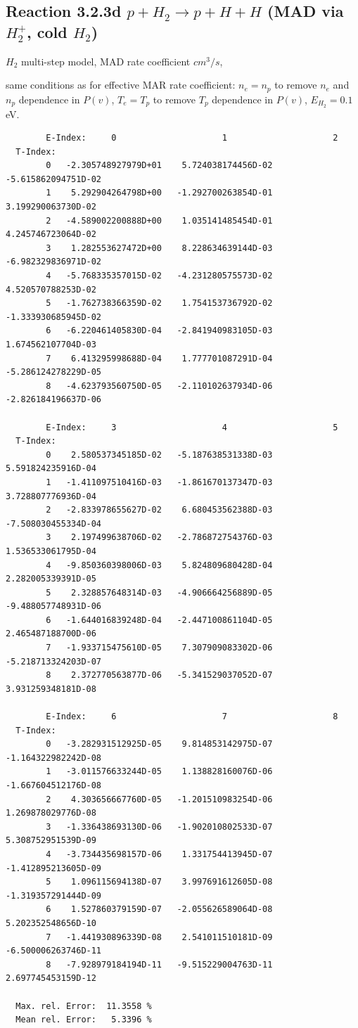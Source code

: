 \documentclass[12pt,dvips]{article}
\begin{document}
\subsection{
Reaction 3.2.3d   $p + H_2   \rightarrow p + H + H  $ (MAD via $H_2^+$, cold $H_2$)
}

$H_2$ multi-step model, MAD rate coefficient $cm^3/s$,

same conditions as for effective MAR rate coefficient: $n_e=n_p$ to remove $n_e$ and $n_p$ dependence in $P(v)$,
$T_e=T_p$ to remove $T_p$ dependence in $P(v)$,  $E_{H_2}=0.1$ eV.

\begin{small}\begin{verbatim}
        E-Index:     0                     1                     2
  T-Index:
        0   -2.305748927979D+01    5.724038174456D-02   -5.615862094751D-02
        1    5.292904264798D+00   -1.292700263854D-01    3.199290063730D-02
        2   -4.589002200888D+00    1.035141485454D-01    4.245746723064D-02
        3    1.282553627472D+00    8.228634639144D-03   -6.982329836971D-02
        4   -5.768335357015D-02   -4.231280575573D-02    4.520570788253D-02
        5   -1.762738366359D-02    1.754153736792D-02   -1.333930685945D-02
        6   -6.220461405830D-04   -2.841940983105D-03    1.674562107704D-03
        7    6.413295998688D-04    1.777701087291D-04   -5.286124278229D-05
        8   -4.623793560750D-05   -2.110102637934D-06   -2.826184196637D-06

        E-Index:     3                     4                     5
  T-Index:
        0    2.580537345185D-02   -5.187638531338D-03    5.591824235916D-04
        1   -1.411097510416D-03   -1.861670137347D-03    3.728807776936D-04
        2   -2.833978655627D-02    6.680453562388D-03   -7.508030455334D-04
        3    2.197499638706D-02   -2.786872754376D-03    1.536533061795D-04
        4   -9.850360398006D-03    5.824809680428D-04    2.282005339391D-05
        5    2.328857648314D-03   -4.906664256889D-05   -9.488057748931D-06
        6   -1.644016839248D-04   -2.447100861104D-05    2.465487188700D-06
        7   -1.933715475610D-05    7.307909083302D-06   -5.218713324203D-07
        8    2.372770563877D-06   -5.341529037052D-07    3.931259348181D-08

        E-Index:     6                     7                     8
  T-Index:
        0   -3.282931512925D-05    9.814853142975D-07   -1.164322982242D-08
        1   -3.011576633244D-05    1.138828160076D-06   -1.667604512176D-08
        2    4.303656667760D-05   -1.201510983254D-06    1.269878029776D-08
        3   -1.336438693130D-06   -1.902010802533D-07    5.308752951539D-09
        4   -3.734435698157D-06    1.331754413945D-07   -1.412895213605D-09
        5    1.096115694138D-07    3.997691612605D-08   -1.319357291444D-09
        6    1.527860379159D-07   -2.055626589064D-08    5.202352548656D-10
        7   -1.441930896339D-08    2.541011510181D-09   -6.500006263746D-11
        8   -7.928979184194D-11   -9.515229004763D-11    2.697745453159D-12

  Max. rel. Error:  11.3558 %
  Mean rel. Error:   5.3396 %


\end{verbatim}\end{small}
\end{document}
